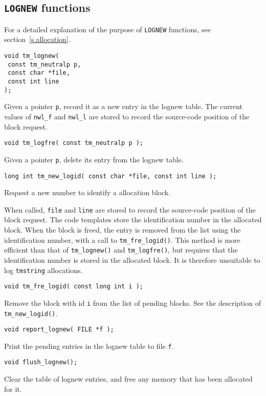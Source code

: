 \subsection{\texttt{LOGNEW} functions}
For a detailed explanation of the purpose of \texttt{LOGNEW} functions,
see section~\ref{s.allocation}.
\begin{verbatim}
void tm_lognew(
 const tm_neutralp p,
 const char *file,
 const int line
);
\end{verbatim}
\begin{desc}
Given a pointer \texttt{p}, record it as a new entry in the lognew table.
The current values of \verb+nwl_f+ and \verb+nwl_l+
are stored to record the source-code position of the block request.
\end{desc}
\begin{verbatim}
void tm_logfre( const tm_neutralp p );
\end{verbatim}
\begin{desc}
Given a pointer \texttt{p}, delete its entry from the lognew table.
\end{desc}
\begin{verbatim}
long int tm_new_logid( const char *file, const int line );
\end{verbatim}
\begin{desc}
Request a new number to identify a {\Tm} allocation block.
\par
When called, \verb+file+ and \verb+line+
are stored to record the source-code position of the block request.
The {\Tm} code templates store the identification number in the
allocated block.
When the block is freed, the entry is removed from the list
using the identification number, with a call to \verb+tm_fre_logid()+.
This method is more efficient than that of \verb+tm_lognew()+
and \verb+tm_logfre()+,
but requires that the identification number is stored in the
allocated block.
It is therefore unsuitable to log \verb+tmstring+ allocations.
\end{desc}
\begin{verbatim}
void tm_fre_logid( const long int i );
\end{verbatim}
\begin{desc}
Remove the block with id \texttt{i} from the list of pending blocks.
See the description of \verb+tm_new_logid()+.
\end{desc}
\begin{verbatim}
void report_lognew( FILE *f );
\end{verbatim}
\begin{desc}
Print the pending entries in the lognew table to file \texttt{f}.
\end{desc}
\begin{verbatim}
void flush_lognew();
\end{verbatim}
\begin{desc}
Clear the table of lognew entries, and free any memory that
has been allocated for it.
\end{desc}
